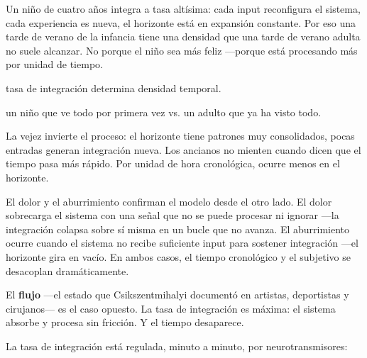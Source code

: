 Un niño de cuatro años integra a tasa altísima: cada input reconfigura el sistema, cada experiencia es nueva, el horizonte está en expansión constante. Por eso una tarde de verano de la infancia tiene una densidad que una tarde de verano adulta no suele alcanzar. No porque el niño sea más feliz —porque está procesando más por unidad de tiempo.

\begin{fisica}
 tasa de integración determina densidad temporal.

 un niño que ve todo por primera vez vs. un adulto que ya ha visto todo.
\end{fisica}
La vejez invierte el proceso: el horizonte tiene patrones muy consolidados, pocas entradas generan integración nueva. Los ancianos no mienten cuando dicen que el tiempo pasa más rápido. Por unidad de hora cronológica, ocurre menos en el horizonte.

El dolor y el aburrimiento confirman el modelo desde el otro lado. El dolor sobrecarga el sistema con una señal que no se puede procesar ni ignorar —la integración colapsa sobre sí misma en un bucle que no avanza. El aburrimiento ocurre cuando el sistema no recibe suficiente input para sostener integración —el horizonte gira en vacío. En ambos casos, el tiempo cronológico y el subjetivo se desacoplan dramáticamente.

El \textbf{flujo} —el estado que Csikszentmihalyi documentó en artistas, deportistas y cirujanos— es el caso opuesto. La tasa de integración es máxima: el sistema absorbe y procesa sin fricción. Y el tiempo desaparece.

\noindent La tasa de integración está regulada, minuto a minuto, por neurotransmisores:

